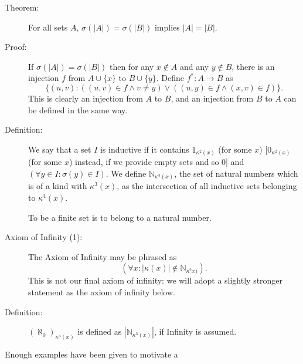 \documentclass[12pt]{article}
\begin{document}
\begin{description}
\item[Theorem:]  For all sets $A$, $\sigma(|A|) = \sigma(|B|)$ implies $|A|=|B|$.

\item[Proof:]  If $\sigma(|A|) = \sigma(|B|)$ then for any $x \not\in A$ and any $y \not\in B$, there is an injection $f$ from $A \cup \{x\}$ to $B\cup \{y\}$.  Define $f^*:A \rightarrow B$ as $$\{(u,v):((u,v) \in f \wedge v \neq y) \vee ((u,y) \in f \wedge (x,v) \in f)\}.$$  This is clearly an injection from $A$ to $B$, and an injection from $B$ to $A$ can be defined in the same way.

\item[Definition:]  We say that a set $I$ is inductive if it contains $1_{\kappa^2(x)}$ (for some $x$) [$0_{\kappa^2(x)}$ (for some $x$) instead, if we provide empty sets and so 0] and $(\forall y \in I:\sigma(y) \in I)$.  We define ${\mathbb N}_{\kappa^3(x)}$, the set of natural numbers which is of a kind with $\kappa^3(x)$, as the intersection of all inductive sets belonging to $\kappa^4(x)$.

To be a finite set is to belong to a natural number.

\item[Axiom of Infinity (1):]  The Axiom of Infinity may be phrased as $$(\forall x:|\kappa(x)| \not\in {\mathbb N}_{\kappa^2x)}).$$  This is not our final axiom of infinity:  we will adopt a slightly stronger statement as the axiom of infinity below.


\item[Definition:]  $(\aleph_0)_{\kappa^4(x)}$ is defined as $|{\mathbb N}_{\kappa^3(x)}| $, if Infinity is assumed.



\end{description}


Enough examples have been given to motivate a 
\end{document}
